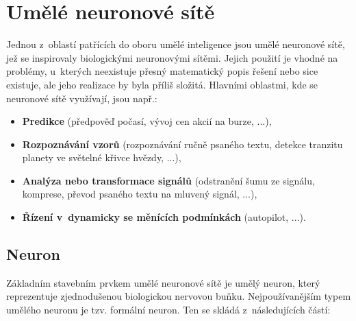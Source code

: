 \documentclass[a4paper,12pt]{article}
\begin{document}
{\section{Umělé neuronové sítě}

Jednou z~oblastí patřících do oboru umělé inteligence jsou umělé neuronové sítě, jež se inspirovaly biologickými neuronovými sítěmi. Jejich použití je vhodné na problémy, u~kterých neexistuje přesný matematický popis řešení nebo sice existuje, ale jeho realizace by byla příliš složitá. Hlavními oblastmi, kde se neuronové sítě využívají, jsou např.:

\begin{itemize}
\item \textbf{Predikce} (předpověď počasí,  vývoj cen akcií na burze, ...),

\item \textbf{Rozpoznávání vzorů} (rozpoznávání ručně psaného textu, detekce tranzitu planety ve světelné křivce hvězdy, ...),

\item \textbf{Analýza nebo transformace signálů} (odstranění šumu ze signálu, komprese, převod psaného textu na mluvený signál, ...),

\item \textbf{Řízení v~dynamicky se měnících podmínkách} (autopilot, ...).~\cite{nn}

\end{itemize}

\subsection{Neuron}

Základním stavebním prvkem umělé neuronové sítě je umělý neuron, který reprezentuje zjednodušenou biologickou nervovou buňku. Nejpoužívanějším typem umělého neuronu je tzv. formální neuron. Ten se skládá z~následujících částí:

{

}}
\end{document}
